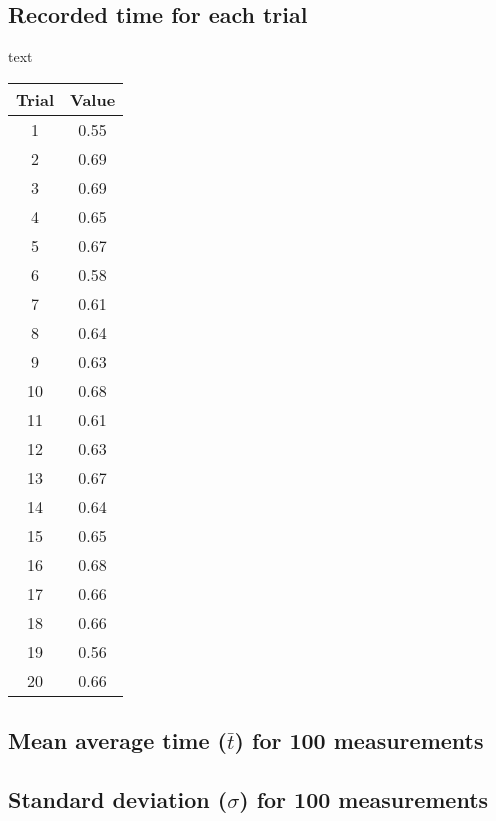 \documentclass[11pt, letterpaper, includehead]{article}
\begin{document}
  \subsection{Recorded time for each trial} %
  text
  \begin{center} 
    \begin{tabular}{|| c | c ||} 
      \hline
      Trial & Value \\
      \hline
        1 & 0.55 \\ 
         \hline
        2 & 0.69 \\ 
         \hline
        3 & 0.69 \\ 
         \hline
        4 & 0.65 \\ 
         \hline
        5 & 0.67 \\ 
         \hline
        6 & 0.58 \\ 
         \hline
        7 & 0.61 \\ 
         \hline
        8 & 0.64 \\ 
         \hline
        9 & 0.63 \\ 
         \hline
        10 & 0.68 \\ 
         \hline
        11 & 0.61 \\ 
         \hline
        12 & 0.63 \\ 
         \hline
        13 & 0.67 \\ 
         \hline
        14 & 0.64 \\ 
         \hline
        15 & 0.65 \\ 
         \hline
        16 & 0.68 \\ 
         \hline
        17 & 0.66 \\ 
         \hline
        18 & 0.66 \\ 
         \hline
        19 & 0.56 \\ 
         \hline
        20 & 0.66 \\ 
         \hline
      \hline 
    \end{tabular} 
  \end{center}
 
 
   

  \setcounter{subsection}{3} %
  \subsection{Mean average time ($\bar{t}$) for 100 measurements} %

  \subsection{Standard deviation ($\sigma$) for 100 measurements} %
\end{document}
